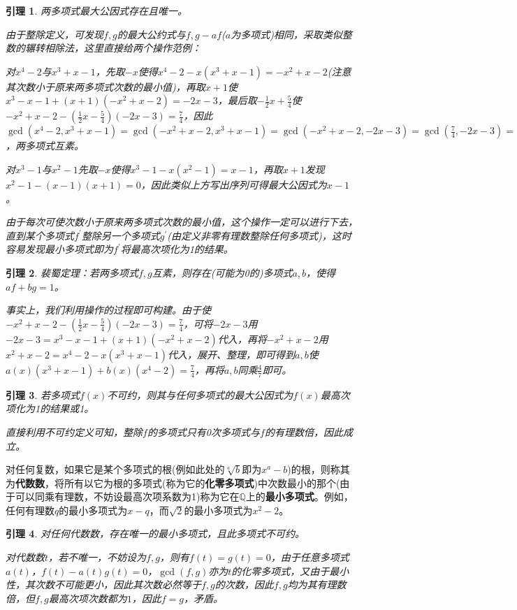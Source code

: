 \documentclass[UTF8]{ctexart}
\newtheorem{lem}{引理}
\begin{document}
\begin{lem}两多项式最大公因式存在且唯一。

由于整除定义，可发现$f,g$的最大公约式与$f,g-af$($a$为多项式)相同，采取类似整数的辗转相除法，这里直接给两个操作范例：

对$x^4-2$与$x^3+x-1$，先取$-x$使得$x^4-2-x(x^3+x-1)=-x^2+x-2$(注意其次数小于原来两多项式次数的最小值)，再取$x+1$使$x^3-x-1+(x+1)(-x^2+x-2)=-2x-3$，最后取$-\frac{1}{2}x+\frac{5}{4}$使$-x^2+x-2-(\frac{1}{2}x-\frac{5}{4})(-2x-3)=\frac{7}{4}$，因此$\gcd(x^4-2,x^3+x-1)=\gcd(-x^2+x-2,x^3+x-1)=\gcd(-x^2+x-2,-2x-3)=\gcd(\frac{7}{4},-2x-3)=1$，两多项式互素。

对$x^3-1$与$x^2-1$先取$-x$使得$x^3-1-x(x^2-1)=x-1$，再取$x+1$发现$x^2-1-(x-1)(x+1)=0$，因此类似上方写出序列可得最大公因式为$x-1$。

由于每次可使次数小于原来两多项式次数的最小值，这个操作一定可以进行下去，直到某个多项式$f^\prime$整除另一个多项式$g^\prime$(由定义非零有理数整除任何多项式)，这时容易发现最小多项式即为$f^\prime$将最高次项化为1的结果。
\end{lem}

\begin{lem} 裴蜀定理：若两多项式$f,g$互素，则存在(可能为0的)多项式$a,b$，使得$af+bg=1$。

事实上，我们利用操作的过程即可构建。由于使$-x^2+x-2-(\frac{1}{2}x-\frac{5}{4})(-2x-3)=\frac{7}{4}$，可将$-2x-3$用$-2x-3=x^3-x-1+(x+1)(-x^2+x-2)$代入，再将$-x^2+x-2$用$x^2+x-2=x^4-2-x(x^3+x-1)$代入，展开、整理，即可得到$a,b$使$a(x)(x^3+x-1)+b(x)(x^4-2)=\frac{7}{4}$，再将$a,b$同乘$\frac{4}{7}$即可。

\end{lem}

\begin{lem} 若多项式$f(x)$不可约，则其与任何多项式的最大公因式为$f(x)$最高次项化为1的结果或1。
	
直接利用不可约定义可知，整除$f$的多项式只有0次多项式与$f$的有理数倍，因此成立。
\end{lem}

对任何复数，如果它是某个多项式的根(例如此处的$\sqrt[a]b$即为$x^a-b$)的根，则称其为\textbf{代数数}，将所有以它为根的多项式(称为它的\textbf{化零多项式})中次数最小的那个(由于可以同乘有理数，不妨设最高次项系数为1)称为它在$\mathbb{Q}$上的\textbf{最小多项式}。例如，任何有理数$q$的最小多项式为$x-q$，而$\sqrt2$的最小多项式为$x^2-2$。

\begin{lem} 对任何代数数，存在唯一的最小多项式，且此多项式不可约。

对代数数$t$，若不唯一，不妨设为$f,g$，则有$f(t)=g(t)=0$，由于任意多项式$a(t)$，$f(t)-a(t)g(t)=0$，$\gcd(f,g)$亦为$t$的化零多项式，又由于最小性，其次数不可能更小，因此其次数必然等于$f,g$的次数，因此$f,g$均为其有理数倍，但$f,g$最高次项次数都为$1$，因此$f=g$，矛盾。
\end{lem}
\end{document}
